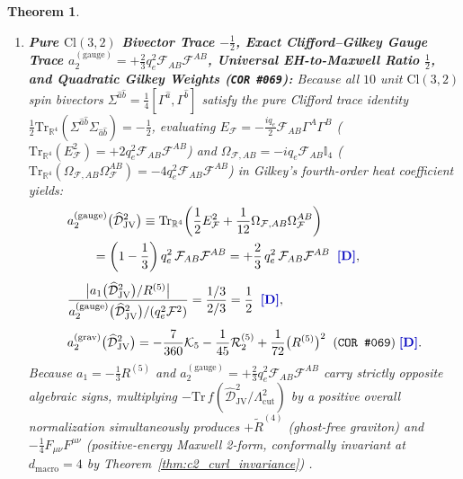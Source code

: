 \documentclass[11pt,a4paper]{article}
\newcommand{\catD}{\text{\textbf{\textcolor{blue!75!black}{[D]}}}}
\theoremstyle{definition}
\theoremstyle{plain}
\newtheorem{theorem}[axiom]{Theorem}
\theoremstyle{remark}
\begin{document}
\begin{theorem}
\begin{enumerate}[label=(\roman*)]
  \item \textbf{Pure $\mathrm{Cl}(3,2)$ Bivector Trace $-\frac{1}{2}$, Exact Clifford--Gilkey Gauge Trace $a_2^{(\mathrm{gauge})} = +\frac{2}{3}q_e^2\mathcal{F}_{AB}\mathcal{F}^{AB}$, Universal EH-to-Maxwell Ratio $\frac{1}{2}$, and Quadratic Gilkey Weights (\texttt{COR~\#069}):}
  Because all $10$ unit $\mathrm{Cl}(3,2)$ spin bivectors $\Sigma^{\hat{a}\hat{b}} = \frac{1}{4}[\Gamma^{\hat{a}}, \Gamma^{\hat{b}}]$ satisfy the pure Clifford trace identity $\frac{1}{2}\mathrm{Tr}_{\mathbb{R}^4}(\Sigma^{\hat{a}\hat{b}}\Sigma_{\hat{a}\hat{b}}) = -\frac{1}{2}$, evaluating $E_{\mathcal{F}} = -\frac{iq_e}{2}\mathcal{F}_{AB}\Gamma^A\Gamma^B$ ($\mathrm{Tr}_{\mathbb{R}^4}(E_{\mathcal{F}}^2) = +2q_e^2\mathcal{F}_{AB}\mathcal{F}^{AB}$) and $\Omega_{\mathcal{F},AB} = -iq_e\mathcal{F}_{AB}\mathbb{I}_4$ ($\mathrm{Tr}_{\mathbb{R}^4}(\Omega_{\mathcal{F},AB}\Omega_{\mathcal{F}}^{AB}) = -4q_e^2\mathcal{F}_{AB}\mathcal{F}^{AB}$) in Gilkey's fourth-order heat coefficient yields:
  \begin{equation}\label{eq:c6_gilkey_a2}
  \begin{aligned}
  &a_2^{(\mathrm{gauge})}\bigl(\widehat{\mathcal{D}}_{\mathrm{JV}}^2\bigr) \equiv \mathrm{Tr}_{\mathbb{R}^4}\!\left(\frac{1}{2}E_{\mathcal{F}}^2 + \frac{1}{12}\Omega_{\mathcal{F},AB}\Omega_{\mathcal{F}}^{AB}\right) \\
  &\qquad = \left(1 - \frac{1}{3}\right)q_e^2\,\mathcal{F}_{AB}\mathcal{F}^{AB} = +\frac{2}{3}\,q_e^2\,\mathcal{F}_{AB}\mathcal{F}^{AB} \;\; \catD, \\[4pt]
  &\frac{\bigl|a_1\bigl(\widehat{\mathcal{D}}_{\mathrm{JV}}^2\bigr)/R^{(5)}\bigr|}{a_2^{(\mathrm{gauge})}\bigl(\widehat{\mathcal{D}}_{\mathrm{JV}}^2\bigr)/(q_e^2\mathcal{F}^2)} = \frac{1/3}{2/3} = \frac{1}{2} \;\; \catD, \\[4pt]
  &a_2^{(\mathrm{grav})}\bigl(\widehat{\mathcal{D}}_{\mathrm{JV}}^2\bigr) = -\frac{7}{360}\mathcal{K}_5 - \frac{1}{45}\mathcal{R}_2^{(5)} + \frac{1}{72}\bigl(R^{(5)}\bigr)^2 \;\; (\text{\texttt{COR~\#069}}) \;\catD.
  \end{aligned}
  \end{equation}
  Because $a_1 = -\frac{1}{3}R^{(5)}$ and $a_2^{(\mathrm{gauge})} = +\frac{2}{3}q_e^2\mathcal{F}_{AB}\mathcal{F}^{AB}$ carry strictly opposite algebraic signs, multiplying $-\mathrm{Tr}\,f(\widehat{\mathcal{D}}_{\mathrm{JV}}^2/\Lambda_{\mathrm{cut}}^2)$ by a positive overall normalization simultaneously produces $+\tilde{R}^{(4)}$ (ghost-free graviton) and $-\frac{1}{4}F_{\mu\nu}F^{\mu\nu}$ (positive-energy Maxwell 2-form, conformally invariant at $d_{\mathrm{macro}} = 4$ by Theorem~\ref{thm:c2_curl_invariance}) \catD.

\end{enumerate}
\end{theorem}
\end{document}
